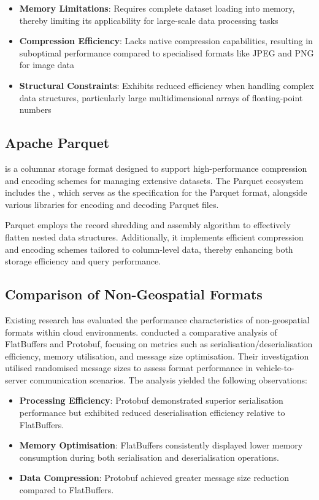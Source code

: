\begin{itemize}
  \item \textbf{Memory Limitations}: Requires complete dataset loading into memory, thereby limiting its applicability for large-scale data processing tasks
  \item \textbf{Compression Efficiency}: Lacks native compression capabilities, resulting in suboptimal performance compared to specialised formats like JPEG and PNG for image data
  \item \textbf{Structural Constraints}: Exhibits reduced efficiency when handling complex data structures, particularly large multidimensional arrays of floating-point numbers
\end{itemize}

\subsection{Apache Parquet}
\label{rw:non_geospatial_formats:parquet}
\citet{parquet} is a columnar storage format designed to support high-performance compression and encoding schemes for managing extensive datasets. The Parquet ecosystem includes the \citet{parquet-format}, which serves as the specification for the Parquet format, alongside various libraries for encoding and decoding Parquet files.

Parquet employs the record shredding and assembly algorithm \citep{dremel_2010} to effectively flatten nested data structures. Additionally, it implements efficient compression and encoding schemes tailored to column-level data, thereby enhancing both storage efficiency and query performance.

\subsection{Comparison of Non-Geospatial Formats}
\label{rw:non_geospatial_formats:comparison}
Existing research has evaluated the performance characteristics of non-geospatial formats within cloud environments. \citet{daniel_persson_2020} conducted a comparative analysis of FlatBuffers and Protobuf, focusing on metrics such as serialisation/deserialisation efficiency, memory utilisation, and message size optimisation. Their investigation utilised randomised message sizes to assess format performance in vehicle-to-server communication scenarios. The analysis yielded the following observations:

\begin{itemize}
  \item \textbf{Processing Efficiency}: Protobuf demonstrated superior serialisation performance but exhibited reduced deserialisation efficiency relative to FlatBuffers.
  \item \textbf{Memory Optimisation}: FlatBuffers consistently displayed lower memory consumption during both serialisation and deserialisation operations.
  \item \textbf{Data Compression}: Protobuf achieved greater message size reduction compared to FlatBuffers.
\end{itemize}

